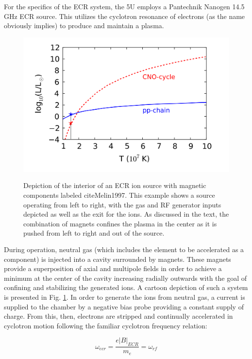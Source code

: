 For the specifics of the ECR system, the 5U employs a Pantechnik Nanogen 14.5 GHz ECR source. This utilizes the cyclotron resonance of electrons (as the name obviously implies) to produce and maintain a plasma.


\begin{figure}
\includegraphics[width=\linewidth]{figures/energyProduction.png}
\label{fig: ecris}
\caption{Depiction of the interior of an ECR ion source with magnetic components labeled cite{Melin1997}. This example shows a source operating from left to right, with the gas and RF generator inputs depicted as well as the exit for the ions. As discussed in the text, the combination of magnets confines the plasma in the center as it is pushed from left to right and out of the source.}
\end{figure}


During operation, neutral gas (which includes the element to be accelerated as a component) is injected into a cavity surrounded by magnets. These magnets provide a superposition of axial and multipole fields in order to achieve a minimum at the center of the cavity increasing radially outwards with the goal of confining and stabilizing the generated ions. A cartoon depiction of such a system is presented in Fig. \ref{fig: ecris}. In order to generate the ions from neutral gas, a current is supplied to the chamber by a negative bias probe providing a constant supply of charge. From this, then, electrons are stripped and continually accelerated in cyclotron motion following the familiar cyclotron frequency relation:

\begin{equation}
\omega_{ecr} = \dfrac{e | B |_{ECR}}{m_{e}} = \omega_{rf}
\label{eqn: ecr}
\end{equation}

